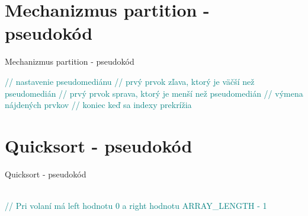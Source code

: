 \documentclass{beamer}
\newcommand{\cmnt}[1]{\textcolor{teal}{#1}}
\begin{document}
\section{Mechanizmus partition - pseudokód}
\begin{frame}{Mechanizmus partition - pseudokód \cite{QuicksortPseudo}}
    \vspace{-0.7em}
    \footnotesize
    \begin{algorithmic}
      \STATE{}
       \hfill \cmnt{// nastavenie pseudomediánu}
      \REPEAT
          \hfill \cmnt{// prvý prvok zľava, ktorý je väčší než pseudomedián}
      \ENDWHILE
         \hfill \cmnt{// prvý prvok sprava, ktorý je menší než pseudomedián}
      \ENDWHILE
         \hfill \cmnt{// výmena nájdených prvkov}
      \ENDIF
       \hfill \cmnt{// koniec keď sa indexy prekrížia}
      \end{algorithmic}
    \label{alg:partition}
\end{frame}

\section{Quicksort - pseudokód}
\begin{frame}{Quicksort - pseudokód \cite{QuicksortPseudo}}
    \footnotesize
    \begin{algorithmic}
      \STATE{}\\
      \cmnt{// Pri volaní má left hodnotu 0 a right hodnotu ARRAY\_LENGTH - 1}\\
      \ENDIF
      \ENDIF
      \end{algorithmic}
    \label{alg:quicksort}
\end{frame}
\end{document}
